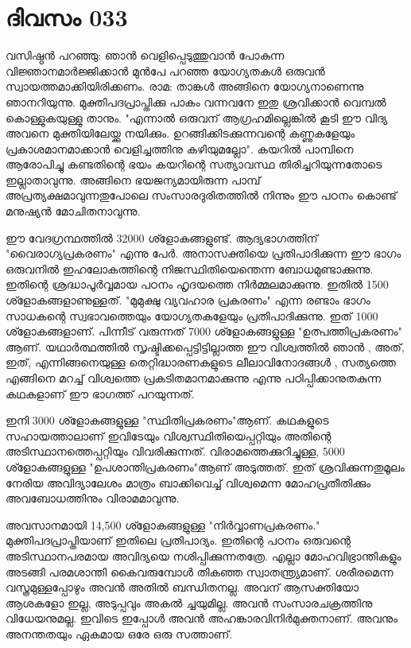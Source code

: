  
\section{ദിവസം 033}


വസിഷ്ഠന്‍ പറഞ്ഞു: ഞാന്‍ വെളിപ്പെടുത്തുവാന്‍ പോകുന്ന വിജ്ഞാനമാര്‍ജ്ജിക്കാന്‍ മുന്‍പേ പറഞ്ഞ യോഗ്യതകള്‍ ഒരുവന്‍ സ്വായത്തമാക്കിയിരിക്കണം. രാമ: താങ്കള്‍ അങ്ങിനെ യോഗ്യനാണെന്നു ഞാനറിയുന്നു. മുക്തിപദപ്രാപ്തിക്കു പാകം വന്നവനേ ഇതു ശ്രവിക്കാന്‍ വെമ്പല്‍ കൊള്ളുകയുള്ളു താനും. "എന്നാല്‍ ഒരുവന്‌ ആഗ്രഹമില്ലെങ്കില്‍ കൂടി ഈ വിദ്യ അവനെ മുക്തിയിലേയ്ക്കു നയിക്കും. ഉറങ്ങിക്കിടക്കുന്നവന്റെ കണ്ണുകളേയും പ്രകാശമാനമാക്കാന്‍ വെളിച്ചത്തിനു കഴിയുമല്ലോ". കയറില്‍ പാമ്പിനെ ആരോപിച്ചു കണ്ടതിന്റെ ഭയം കയറിന്റെ സത്യാവസ്ഥ തിരിച്ചറിയുന്നതോടെ ഇല്ലാതാവുന്നു. അങ്ങിനെ ഭയജന്യമായിരുന്ന പാമ്പ്‌ അപ്രത്യക്ഷമാവുന്നതുപോലെ സംസാരദുരിതത്തില്‍ നിന്നും ഈ പഠനം കൊണ്ട്‌ മനുഷ്യന്‍ മോചിതനാവുന്നു.

ഈ വേദഗ്രന്ഥത്തില്‍ 32000 ശ്ളോകങ്ങളുണ്ട്‌. ആദ്യഭാഗത്തിന്‌  "വൈരാഗ്യപ്രകരണം" എന്നു പേര്‍. അനാസക്തിയെ പ്രതിപാദിക്കുന്ന ഈ ഭാഗം ഒരുവനില്‍ ഇഹലോകത്തിന്റെ നിജസ്ഥിതിയെന്തെന്ന ബോധമുണ്ടാക്കുന്നു. ഇതിന്റെ ശ്രദ്ധാപൂര്‍വ്വമായ പഠനം ഹൃദയത്തെ നിര്‍മ്മലമാക്കുന്നു. ഇതില്‍ 1500 ശ്ളോകങ്ങളാണുള്ളത്‌. "മുമുക്ഷു വ്യവഹാര പ്രകരണം" എന്ന രണ്ടാം ഭാഗം സാധകന്റെ സ്വഭാവത്തെയും യോഗ്യതകളേയും പ്രതിപാദിക്കുന്നു. ഇത്‌ 1000 ശ്ളോകങ്ങളാണ്‌. പിന്നീട്‌ വരുന്നത്‌ 7000 ശ്ളോകങ്ങളുള്ള "ഉത്പത്തിപ്രകരണം" ആണ്‌. യഥാര്‍ത്ഥത്തില്‍ സൃഷ്ടിക്കപ്പെട്ടിട്ടില്ലാത്ത ഈ വിശ്വത്തില്‍ ഞാന്‍ , അത്‌, ഇത്‌, എന്നിങ്ങനെയുള്ള തെറ്റിദ്ധാരണകളുടെ ലീലാവിനോദങ്ങള്‍ , സത്യത്തെ എങ്ങിനെ  മറച്ച്‌ വിശ്വത്തെ പ്രകടിതമാനമാക്കുന്നു എന്നു പഠിപ്പിക്കാനുതകുന്ന കഥകളാണ്‌ ഈ ഭാഗത്ത്‌ പറയുന്നത്‌.

ഇനി 3000 ശ്ളോകങ്ങളുള്ള "സ്ഥിതിപ്രകരണം"ആണ്‌. കഥകളുടെ സഹായത്താലാണ്‌ ഇവിടേയും വിശ്വസ്ഥിതിയെപ്പറ്റിയും അതിന്റെ അടിസ്ഥാനത്തെപ്പറ്റിയും വിവരിക്കുന്നത്‌. വിരാമത്തെക്കുറിച്ചുള്ള, 5000 ശ്ളോകങ്ങളുള്ള "ഉപശാന്തിപ്രകരണം"ആണ്‌ അടുത്തത്‌. ഇത്‌ ശ്രവിക്കുന്നതുമൂലം നേരിയ അവിദ്യാലേശം മാത്രം ബാക്കിവെച്ച്‌ വിശ്വമെന്ന മോഹപ്രതീതിക്കും അവബോധത്തിനും വിരാമമാവുന്നു.

അവസാനമായി 14,500 ശ്ളോകങ്ങളുള്ള "നിര്‍വ്വാണപ്രകരണം." മുക്തിപദപ്രാപ്തിയാണ്‌ ഇതിലെ പ്രതിപാദ്യം. ഇതിന്റെ പഠനം ഒരുവന്റെ അടിസ്ഥാനപരമായ അവിദ്യയെ നശിപ്പിക്കുന്നതത്രേ. എല്ലാ മോഹവിഭ്രാന്തികളും അടങ്ങി പരമശാന്തി കൈവരുമ്പോള്‍ തികഞ്ഞ സ്വാതന്ത്ര്യമാണ്‌. ശരീരമെന്ന വസ്ത്രമുള്ളപ്പോഴും അവന്‍ അതില്‍ ബന്ധിതനല്ല. അവന്‌ ആസക്തിയോ ആശകളോ ഇല്ല, അടുപ്പവും അകല്‍ ച്ചയുമില്ല. അവന്‍ സംസാരചക്രത്തിനു വിധേയനുമല്ല. ഇവിടെ ഇപ്പോള്‍ അവന്‍ അഹങ്കാരവിനിര്‍മുക്തനാണ്‌. അവനും അനന്തതയും ഏകമായ ഒരേ ഒരു സത്താണ്‌.
